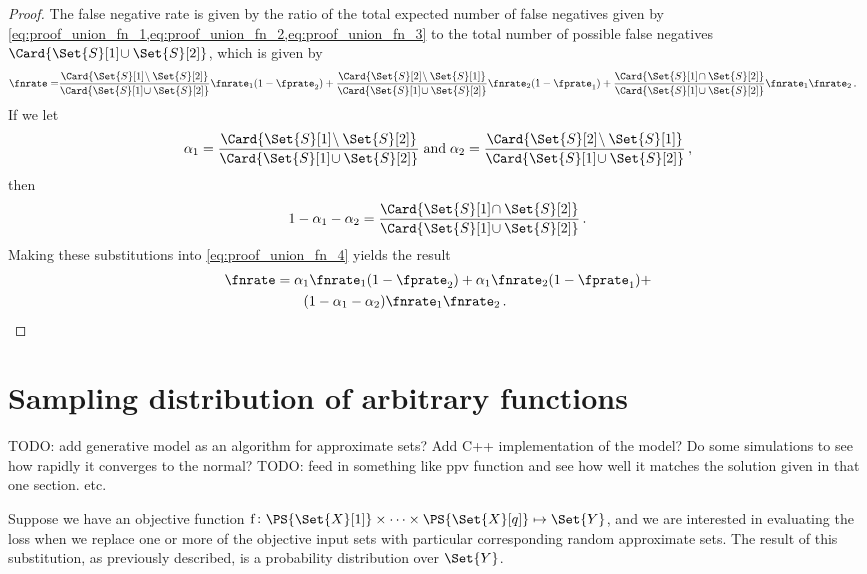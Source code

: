 \documentclass[ ../main.tex]{subfiles}
\begin{document}
{\begin{proof}
The false negative rate is given by the ratio of the total expected number of false negatives given by \cref{eq:proof_union_fn_1,eq:proof_union_fn_2,eq:proof_union_fn_3} to the total number of possible false negatives $\Card{\Set{S}[1] \! \cup \Set{S}[2]}$, which is given by
\begin{equation}
\label{eq:proof_union_fn_4}
\begin{split}
    \fnrate =
        &\frac{\Card{\Set{S}[1] \! \setminus \Set{S}[2]}}{\Card{\Set{S}[1] \! \cup \Set{S}[2]}} \fnrate_1(1 - \fprate_2) + \frac{\Card{\Set{S}[2] \! \setminus \Set{S}[1]}}{\Card{\Set{S}[1] \! \cup \Set{S}[2]}} \fnrate_2(1 - \fprate_1) + \frac{\Card{\Set{S}[1] \! \cap \Set{S}[2]}}{\Card{\Set{S}[1] \! \cup \Set{S}[2]}} \fnrate_1 \fnrate_2\,.
\end{split}
\end{equation}
If we let
\begin{align}
    \alpha_1 = \frac{\Card{\Set{S}[1] \! \setminus \Set{S}[2]}}{\Card{\Set{S}[1] \! \cup \Set{S}[2]}}\; \text{and} \;
    \alpha_2 = \frac{\Card{\Set{S}[2] \! \setminus \Set{S}[1]}}{\Card{\Set{S}[1] \! \cup \Set{S}[2]}}\,,
\end{align}
then
\begin{equation}
    1 - \alpha_1 - \alpha_2 = \frac{\Card{\Set{S}[1] \! \cap \Set{S}[2]}}{\Card{\Set{S}[1] \! \cup \Set{S}[2]}}\,.
\end{equation}
Making these substitutions into \cref{eq:proof_union_fn_4} yields the result
\begin{equation}
\begin{split}
    \fnrate &= \alpha_1 \fnrate_1(1-\fprate_2) + \alpha_1 \fnrate_2(1-\fprate_1) +\\
         &\qquad (1 - \alpha_1 - \alpha_2) \fnrate_1 \fnrate_2\,.
\end{split}
\end{equation}
\end{proof}

\section{Sampling distribution of arbitrary functions}
\label{app:samp}
TODO: add generative model as an algorithm for approximate sets? Add C++ implementation of the model? Do some simulations to see how rapidly it converges to the normal?
TODO: feed in something like ppv function and see how well it matches the solution given in that one section. etc.

Suppose we have an objective function $\operatorname{f} \colon \PS{\Set{X}[1]} \times \cdots \times \PS{\Set{X}[q]} \mapsto \Set{Y}$, and we are interested in evaluating the loss when we replace one or more of the objective input sets with particular corresponding random approximate sets.
The result of this substitution, as previously described, is a probability distribution over $\Set{Y}$.

}
\end{document}

